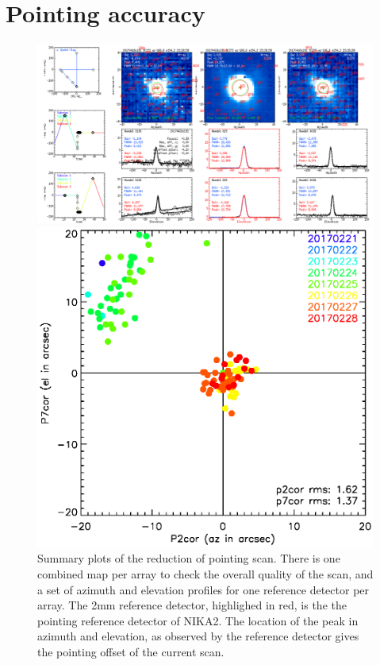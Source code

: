 \section{Pointing accuracy}
\label{se:pointing}

\begin{figure}[p]
\begin{center}
\includegraphics[clip, angle=0, scale = 0.30]{Figures/plot_20170418s192.png}
\caption{Summary plots of the reduction of pointing scan. There is one combined
  map per array to check the overall quality of the scan, and a set of azimuth
  and elevation profiles for one reference detector per array. The 2mm reference
  detector, highlighed in red, is the the pointing reference detector of
  NIKA2. The location of the peak in azimuth and elevation, as observed by the
  reference detector gives the pointing offset of the current scan.}
\label{fig:ptg}
\end{center}
\begin{center}
\includegraphics[clip, angle=0, scale = 0.70]{Figures/pointing_stats_N2R9.eps}

\end{center}
\end{figure}
